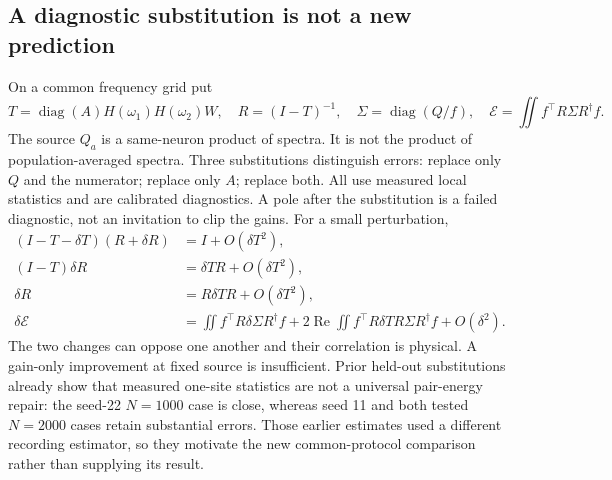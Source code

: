 \subsection{A diagnostic substitution is not a new prediction}
On a common frequency grid put
\begin{equation}
 T=\operatorname{diag}(A)H(\omega_1)H(\omega_2)W,\quad
 R=(I-T)^{-1},\quad \Sigma=\operatorname{diag}(Q/f),\quad
 \mathcal E=\iint f^\top R\Sigma R^\dagger f.
\end{equation}
The source $Q_a$ is a same-neuron product of spectra. It is not the product
of population-averaged spectra. Three substitutions distinguish errors:
replace only $Q$ and the numerator; replace only $A$; replace both. All use
measured local statistics and are calibrated diagnostics. A pole after the
substitution is a failed diagnostic, not an invitation to clip the gains.
For a small perturbation,
\begin{align}
 (I-T-\delta T)(R+\delta R)&=I+O(\delta T^2),\\
 (I-T)\delta R&=\delta T R+O(\delta T^2),\\
 \delta R&=R\delta T R+O(\delta T^2),\\
 \delta\mathcal E
 &=\iint f^\top R\delta\Sigma R^\dagger f
  +2\operatorname{Re}\iint f^\top R\delta T R\Sigma R^\dagger f
  +O(\delta^2).
\end{align}
The two changes can oppose one another and their correlation is physical.
A gain-only improvement at fixed source is insufficient.
Prior held-out substitutions already show that measured one-site statistics
are not a universal pair-energy repair: the seed-22 $N=1000$ case is close,
whereas seed 11 and both tested $N=2000$ cases retain substantial errors.
Those earlier estimates used a different recording estimator, so they
motivate the new common-protocol comparison rather than supplying its result.

